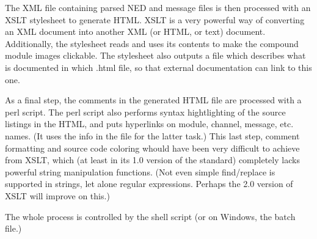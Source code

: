 The XML file containing parsed NED and message files is then processed
with an XSLT stylesheet to generate HTML. XSLT is a very powerful way
of converting an XML document into another XML (or HTML, or text) document.
Additionally, the stylesheet reads  and uses its contents
to make the compound module images clickable.
The stylesheet also outputs a  file which describes what is documented
in which .html file, so that external documentation can link to this one.

As a final step, the comments in the generated HTML file are processed
with a perl script. The perl script also performs syntax hightlighting
of the source listings in the HTML, and puts hyperlinks on module,
channel, message, etc. names. (It uses the info in the  file
for the latter task.) This last step, comment formatting and source code
coloring whould have been very difficult to achieve from XSLT, which
(at least in its 1.0 version of the standard) completely lacks powerful
string manipulation functions. (Not even simple find/replace
is supported in strings, let alone regular expressions. Perhaps the
2.0 version of XSLT will improve on this.)

The whole process is controlled by the  shell script
(or on Windows, the  batch file.)





